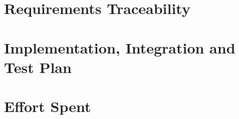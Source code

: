 \documentclass[a4paper]{article}
\begin{document}
\section{Requirements Traceability}


\newpage

\section{Implementation, Integration and Test Plan}

\newpage

\section{Effort Spent}
\end{document}
